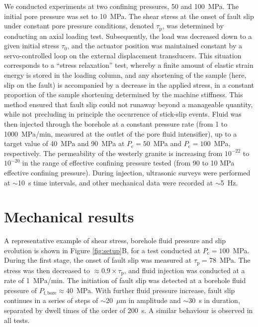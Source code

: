 \documentclass[grl]{agutex2arxiv}
\begin{document}
\begin{article}
We conducted experiments at two confining pressures, 50 and 100~MPa. The initial pore pressure was set to 10~MPa. The shear stress at the onset of fault slip under constant pore pressure conditions, denoted $\tau_\mathrm{p}$, was determined by conducting an axial loading test. Subsequently, the load was decreased down to a given initial stress $\tau_0$, and the actuator position was maintained constant by a servo-controlled loop on the external displacement transducers. This situation corresponds to a ``stress relaxation'' test, whereby a finite amount of elastic strain energy is stored in the loading column, and any shortening of the sample (here, slip on the fault) is accompanied by a decrease in the applied stress, in a constant proportion of the sample shortening determined by the machine stiffness. This method ensured that fault slip could not runaway beyond a manageable quantity, while not precluding in principle the occurrence of stick-slip events. Fluid was then injected through the borehole at a constant pressure rate (from 1 to 1000~MPa/min, measured at the outlet of the pore fluid intensifier), up to a target value of 40~MPa and 90~MPa at $P_\mathrm{c}=50$~MPa and $P_\mathrm{c}=100$~MPa, respectively. The permeability of the westerly granite is increasing from $10^{-22}$ to $10^{-20}$ in the range of effective confining pressure tested (from 90 to 10 MPa effective confining pressure)\citep{Nasseri2009,Rutter2017}. During injection, ultrasonic surveys were performed at $\sim$10~s time intervals, and other mechanical data were recorded at $\sim$5~Hz.


\section{Mechanical results}

A representative example of shear stress, borehole fluid pressure and slip evolution is shown in Figure \ref{fig:setup}B, for a test conducted at $P_\mathrm{c}=100$~MPa. During the first stage, the onset of fault slip was measured at $\tau_\mathrm{p}=78$~MPa. The stress was then decreased to $\approx0.9\times \tau_\mathrm{p}$, and fluid injection was conducted at a rate of 1~MPa/min. The initiation of fault slip was detected at a borehole fluid pressure of $P_\mathrm{f,bore} \approx 40$~MPa. With further fluid pressure increase, fault slip continues in a series of steps of $\sim$20~$\mu$m in amplitude and $\sim$30~s in duration, separated by dwell times of the order of 200~s. A similar behaviour is observed in all tests.



\end{article}
\end{document}
